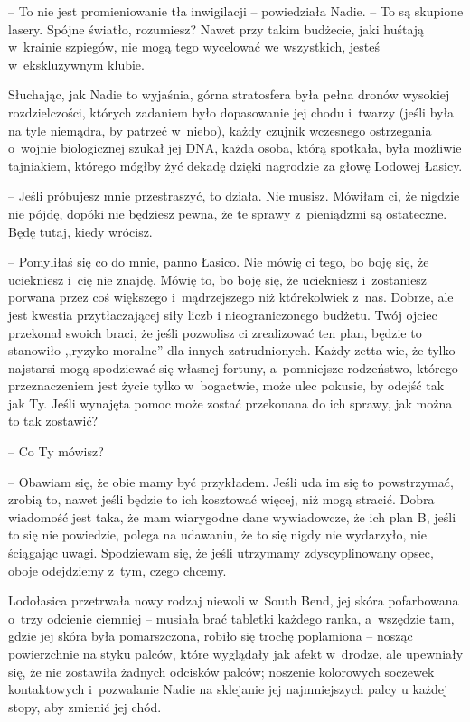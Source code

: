 \documentclass[oneside,polish,11pt,sfheadings]{mwbk}
\begin{document}
-- To nie jest promieniowanie tła inwigilacji -- powiedziała Nadie. -- To
są skupione lasery. Spójne światło, rozumiesz? Nawet przy takim
budżecie, jaki huśtają w~krainie szpiegów, nie mogą tego wycelować we
wszystkich, jesteś w~ekskluzywnym klubie.

Słuchając, jak Nadie to wyjaśnia, górna stratosfera była pełna dronów
wysokiej rozdzielczości, których zadaniem było dopasowanie jej chodu i~twarzy (jeśli była na tyle niemądra, by patrzeć w~niebo), każdy czujnik
wczesnego ostrzegania o~wojnie biologicznej szukał jej DNA, każda osoba,
którą spotkała, była możliwie tajniakiem, którego mógłby żyć dekadę
dzięki nagrodzie za głowę Lodowej Łasicy.

-- Jeśli próbujesz mnie przestraszyć, to działa. Nie musisz. Mówiłam ci,
że nigdzie nie pójdę, dopóki nie będziesz pewna, że te sprawy z~pieniądzmi są ostateczne. Będę tutaj, kiedy wrócisz.

-- Pomyliłaś się co do mnie, panno Łasico. Nie mówię ci tego, bo boję
się, że uciekniesz i~cię nie znajdę. Mówię to, bo boję się, że
uciekniesz i~zostaniesz porwana przez coś większego i~mądrzejszego niż
którekolwiek z~nas. Dobrze, ale jest kwestia przytłaczającej siły liczb
i nieograniczonego budżetu. Twój ojciec przekonał swoich braci, że jeśli
pozwolisz ci zrealizować ten plan, będzie to stanowiło ,,ryzyko
moralne'' dla innych zatrudnionych. Każdy zetta wie, że tylko najstarsi
mogą spodziewać się własnej fortuny, a~pomniejsze rodzeństwo, którego
przeznaczeniem jest życie tylko w~bogactwie, może ulec pokusie, by
odejść tak jak Ty. Jeśli wynajęta pomoc może zostać przekonana do ich
sprawy, jak można to tak zostawić?

-- Co Ty mówisz?

-- Obawiam się, że obie mamy być przykładem. Jeśli uda im się to
powstrzymać, zrobią to, nawet jeśli będzie to ich kosztować więcej, niż
mogą stracić. Dobra wiadomość jest taka, że mam wiarygodne dane
wywiadowcze, że ich plan B, jeśli to się nie powiedzie, polega na
udawaniu, że to się nigdy nie wydarzyło, nie ściągając uwagi. Spodziewam
się, że jeśli utrzymamy zdyscyplinowany opsec, oboje odejdziemy z~tym,
czego chcemy.

Lodołasica przetrwała nowy rodzaj niewoli w~South Bend, jej skóra
pofarbowana o~trzy odcienie ciemniej -- musiała brać tabletki każdego
ranka, a~wszędzie tam, gdzie jej skóra była pomarszczona, robiło się
trochę poplamiona -- nosząc powierzchnie na styku palców, które wyglądały
jak afekt w~drodze, ale upewniały się, że nie zostawiła żadnych odcisków
palców; noszenie kolorowych soczewek kontaktowych i~pozwalanie Nadie na
sklejanie jej najmniejszych palcy u każdej stopy, aby zmienić jej chód.
\end{document}
